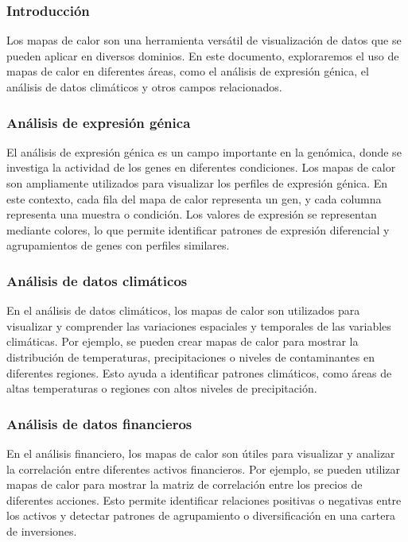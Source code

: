 \documentclass{article}
\begin{document}
\subsubsection{Introducción}
Los mapas de calor son una herramienta versátil de visualización de datos que se pueden aplicar en diversos dominios. En este documento, exploraremos el uso de mapas de calor en diferentes áreas, como el análisis de expresión génica, el análisis de datos climáticos y otros campos relacionados.

\subsubsection{Análisis de expresión génica}
El análisis de expresión génica es un campo importante en la genómica, donde se investiga la actividad de los genes en diferentes condiciones. Los mapas de calor son ampliamente utilizados para visualizar los perfiles de expresión génica. En este contexto, cada fila del mapa de calor representa un gen, y cada columna representa una muestra o condición. Los valores de expresión se representan mediante colores, lo que permite identificar patrones de expresión diferencial y agrupamientos de genes con perfiles similares.

\subsubsection{Análisis de datos climáticos}
En el análisis de datos climáticos, los mapas de calor son utilizados para visualizar y comprender las variaciones espaciales y temporales de las variables climáticas. Por ejemplo, se pueden crear mapas de calor para mostrar la distribución de temperaturas, precipitaciones o niveles de contaminantes en diferentes regiones. Esto ayuda a identificar patrones climáticos, como áreas de altas temperaturas o regiones con altos niveles de precipitación.

\subsubsection{Análisis de datos financieros}
En el análisis financiero, los mapas de calor son útiles para visualizar y analizar la correlación entre diferentes activos financieros. Por ejemplo, se pueden utilizar mapas de calor para mostrar la matriz de correlación entre los precios de diferentes acciones. Esto permite identificar relaciones positivas o negativas entre los activos y detectar patrones de agrupamiento o diversificación en una cartera de inversiones.
\end{document}
